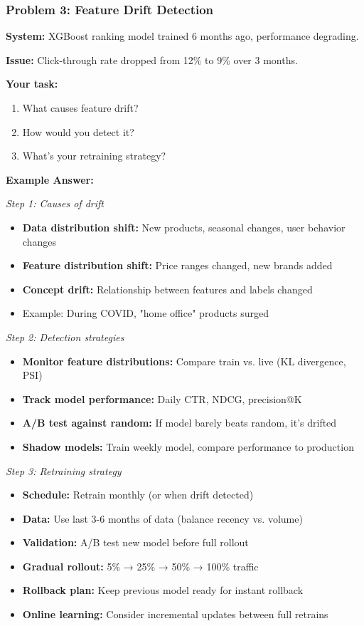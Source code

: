 \documentclass[11pt,letterpaper]{article}
\begin{document}
\subsubsection{Problem 3: Feature Drift Detection}

\textbf{System:} XGBoost ranking model trained 6 months ago, performance degrading.

\textbf{Issue:} Click-through rate dropped from 12\% to 9\% over 3 months.

\textbf{Your task:}
\begin{enumerate}
    \item What causes feature drift?
    \item How would you detect it?
    \item What's your retraining strategy?
\end{enumerate}

\textbf{Example Answer:}

\textit{Step 1: Causes of drift}
\begin{itemize}
    \item \textbf{Data distribution shift:} New products, seasonal changes, user behavior changes
    \item \textbf{Feature distribution shift:} Price ranges changed, new brands added
    \item \textbf{Concept drift:} Relationship between features and labels changed
    \item Example: During COVID, "home office" products surged
\end{itemize}

\textit{Step 2: Detection strategies}
\begin{itemize}
    \item \textbf{Monitor feature distributions:} Compare train vs. live (KL divergence, PSI)
    \item \textbf{Track model performance:} Daily CTR, NDCG, precision@K
    \item \textbf{A/B test against random:} If model barely beats random, it's drifted
    \item \textbf{Shadow models:} Train weekly model, compare performance to production
\end{itemize}

\textit{Step 3: Retraining strategy}
\begin{itemize}
    \item \textbf{Schedule:} Retrain monthly (or when drift detected)
    \item \textbf{Data:} Use last 3-6 months of data (balance recency vs. volume)
    \item \textbf{Validation:} A/B test new model before full rollout
    \item \textbf{Gradual rollout:} 5\% → 25\% → 50\% → 100\% traffic
    \item \textbf{Rollback plan:} Keep previous model ready for instant rollback
    \item \textbf{Online learning:} Consider incremental updates between full retrains
\end{itemize}
\end{document}
